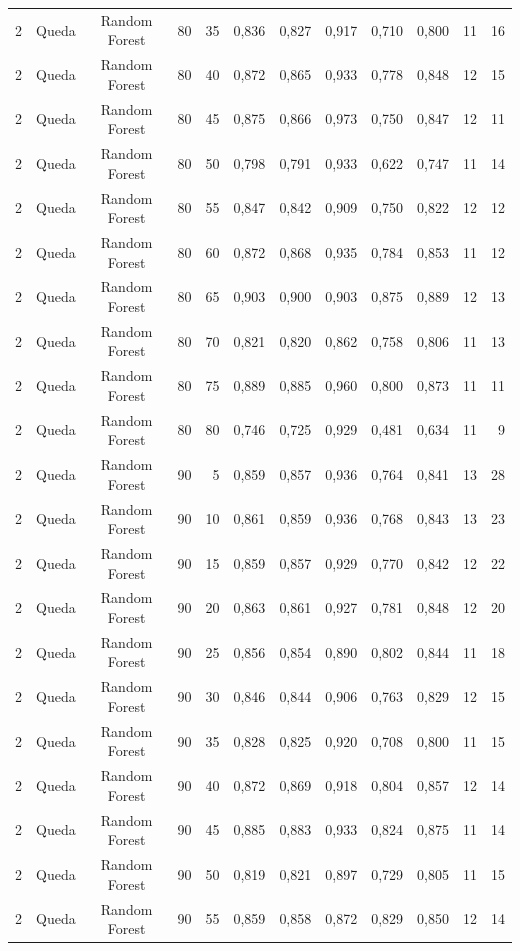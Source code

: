 \begin{longtable}{ccclrrrrrrrr}
2 & Queda & Random Forest & 80 & 35 & 0,836 & 0,827 & 0,917 & 0,710 & 0,800 & 11 & 16 \\
2 & Queda & Random Forest & 80 & 40 & 0,872 & 0,865 & 0,933 & 0,778 & 0,848 & 12 & 15 \\
2 & Queda & Random Forest & 80 & 45 & 0,875 & 0,866 & 0,973 & 0,750 & 0,847 & 12 & 11 \\
2 & Queda & Random Forest & 80 & 50 & 0,798 & 0,791 & 0,933 & 0,622 & 0,747 & 11 & 14 \\
2 & Queda & Random Forest & 80 & 55 & 0,847 & 0,842 & 0,909 & 0,750 & 0,822 & 12 & 12 \\
2 & Queda & Random Forest & 80 & 60 & 0,872 & 0,868 & 0,935 & 0,784 & 0,853 & 11 & 12 \\
2 & Queda & Random Forest & 80 & 65 & 0,903 & 0,900 & 0,903 & 0,875 & 0,889 & 12 & 13 \\
2 & Queda & Random Forest & 80 & 70 & 0,821 & 0,820 & 0,862 & 0,758 & 0,806 & 11 & 13 \\
2 & Queda & Random Forest & 80 & 75 & 0,889 & 0,885 & 0,960 & 0,800 & 0,873 & 11 & 11 \\
2 & Queda & Random Forest & 80 & 80 & 0,746 & 0,725 & 0,929 & 0,481 & 0,634 & 11 & 9 \\
2 & Queda & Random Forest & 90 & 5 & 0,859 & 0,857 & 0,936 & 0,764 & 0,841 & 13 & 28 \\
2 & Queda & Random Forest & 90 & 10 & 0,861 & 0,859 & 0,936 & 0,768 & 0,843 & 13 & 23 \\
2 & Queda & Random Forest & 90 & 15 & 0,859 & 0,857 & 0,929 & 0,770 & 0,842 & 12 & 22 \\
2 & Queda & Random Forest & 90 & 20 & 0,863 & 0,861 & 0,927 & 0,781 & 0,848 & 12 & 20 \\
2 & Queda & Random Forest & 90 & 25 & 0,856 & 0,854 & 0,890 & 0,802 & 0,844 & 11 & 18 \\
2 & Queda & Random Forest & 90 & 30 & 0,846 & 0,844 & 0,906 & 0,763 & 0,829 & 12 & 15 \\
2 & Queda & Random Forest & 90 & 35 & 0,828 & 0,825 & 0,920 & 0,708 & 0,800 & 11 & 15 \\
2 & Queda & Random Forest & 90 & 40 & 0,872 & 0,869 & 0,918 & 0,804 & 0,857 & 12 & 14 \\
2 & Queda & Random Forest & 90 & 45 & 0,885 & 0,883 & 0,933 & 0,824 & 0,875 & 11 & 14 \\
2 & Queda & Random Forest & 90 & 50 & 0,819 & 0,821 & 0,897 & 0,729 & 0,805 & 11 & 15 \\
2 & Queda & Random Forest & 90 & 55 & 0,859 & 0,858 & 0,872 & 0,829 & 0,850 & 12 & 14 \\

\end{longtable}
